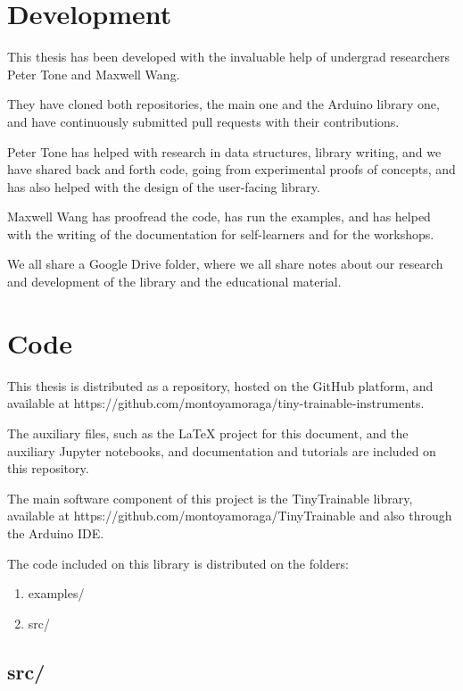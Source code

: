 \section{Development}

This thesis has been developed with the invaluable help of undergrad researchers Peter Tone and Maxwell Wang.

They have cloned both repositories, the main one and the Arduino library one, and have continuously submitted pull requests with their contributions.

Peter Tone has helped with research in data structures, library writing, and we have shared back and forth code, going from experimental proofs of concepts, and has also helped with the design of the user-facing library.

Maxwell Wang has proofread the code, has run the examples, and has helped with the writing of the documentation for self-learners and for the workshops.

We all share a Google Drive folder, where we all share notes about our research and development of the library and the educational material.

\section{Code}

This thesis is distributed as a repository, hosted on the GitHub platform, and available at https://github.com/montoyamoraga/tiny-trainable-instruments.

The auxiliary files, such as the LaTeX project for this document, and the auxiliary Jupyter notebooks, and documentation and tutorials are included on this repository.

The main software component of this project is the TinyTrainable library, available at https://github.com/montoyamoraga/TinyTrainable and also through the Arduino IDE.

The code included on this library is distributed on the folders:

\begin{enumerate}
  \item examples/
  \item src/
\end{enumerate}

\subsection{src/}

